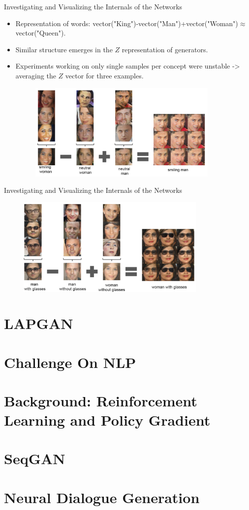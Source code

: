 \documentclass[10pt]{beamer}
\begin{document}
	\begin{frame}{Investigating and Visualizing the Internals of the Networks}
		\begin{itemize}
			\item Representation of words: vector("King")-vector("Man")+vector("Woman")$\approx$vector("Queen").
			\item Similar structure emerges in the $Z$ representation of generators.
			\item Experiments working on only single samples per concept were unstable -> averaging the $Z$ vector for three examples.
			\begin{figure}
				\includegraphics[width=25em]{figures/DCGAN-visualizing-internals-vector-1.PNG}
			\end{figure}
		\end{itemize}
	\end{frame}

	\begin{frame}{Investigating and Visualizing the Internals of the Networks}
		\begin{figure}
			\includegraphics[width=25em]{figures/DCGAN-visualizing-internals-vector-2.PNG}
		\end{figure}
	\end{frame}

	
	\part{LAPGAN}
	\part{Challenge On NLP}
	\part{Background: Reinforcement Learning and Policy Gradient}
	\part{SeqGAN}
	\part{Neural Dialogue Generation}
\end{document}
